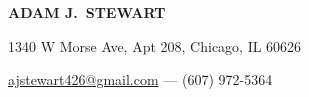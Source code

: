 
\begin{center}

    \textbf{\uppercase{\Large Adam J.\ Stewart}}

    1340 W Morse Ave, Apt 208, Chicago, IL 60626

    \href{mailto:ajstewart426@gmail.com}{ajstewart426@gmail.com} --- (607) 972-5364

\end{center}

\vspace{-14pt}

